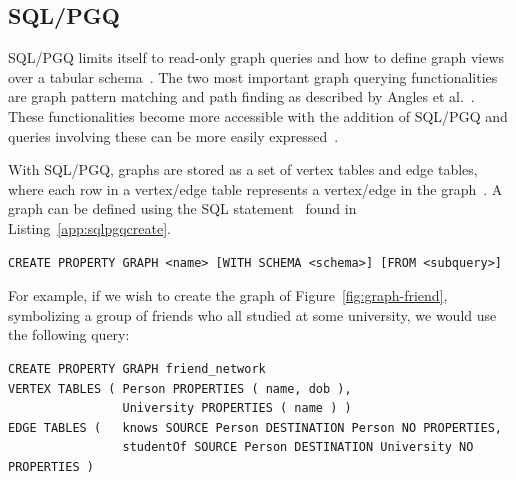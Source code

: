 


\subsection{SQL/PGQ}
SQL/PGQ limits itself to read-only graph queries and how to define graph views over a tabular schema~\cite{Deutsch2021}. 
The two most important graph querying functionalities are graph pattern matching and path finding as described by Angles et al.~\cite{DBLP:journals/csur/AnglesABHRV17}. 
These functionalities become more accessible with the addition of SQL/PGQ and queries involving these can be more easily expressed~\cite{graindb, oracle-sql-example}.

With SQL/PGQ, graphs are stored as a set of vertex tables and edge tables, where each row in a vertex/edge table represents a vertex/edge in the graph~\cite{gql-survey}.
A graph can be defined using the SQL statement~\cite{Neo4j2018} found in Listing~\ref{app:sqlpgqcreate}. 
\begin{lstlisting}[caption=Creating a graph in SQL/PGQ, label=app:sqlpgqcreate] 
CREATE PROPERTY GRAPH <name> [WITH SCHEMA <schema>] [FROM <subquery>]
\end{lstlisting}
For example, if we wish to create the graph of Figure~\ref{fig:graph-friend}, symbolizing a group of friends who all studied at some university, we would use the following query: 

\noindent\begin{minipage}{\linewidth}

\begin{lstlisting}[caption=Creating a friend network graph in SQL/PGQ, label=app:sqlpgqfriendnetwork] 
CREATE PROPERTY GRAPH friend_network 
VERTEX TABLES ( Person PROPERTIES ( name, dob ), 
                University PROPERTIES ( name ) )
EDGE TABLES (   knows SOURCE Person DESTINATION Person NO PROPERTIES, 
                studentOf SOURCE Person DESTINATION University NO PROPERTIES )
\end{lstlisting}
\end{minipage}

